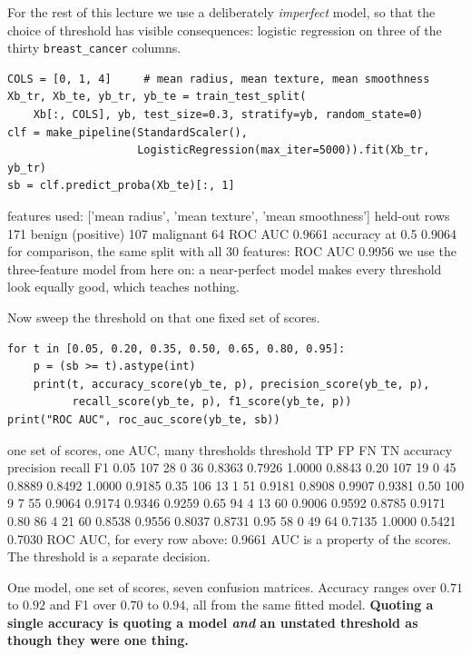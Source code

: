 \documentclass[11pt]{article}
\begin{document}
For the rest of this lecture we use a deliberately \emph{imperfect} model, so
that the choice of threshold has visible consequences: logistic regression on
three of the thirty \texttt{breast\_cancer} columns.

\begin{lstlisting}
COLS = [0, 1, 4]     # mean radius, mean texture, mean smoothness
Xb_tr, Xb_te, yb_tr, yb_te = train_test_split(
    Xb[:, COLS], yb, test_size=0.3, stratify=yb, random_state=0)
clf = make_pipeline(StandardScaler(),
                    LogisticRegression(max_iter=5000)).fit(Xb_tr, yb_tr)
sb = clf.predict_proba(Xb_te)[:, 1]
\end{lstlisting}
\begin{codeout}
features used: ['mean radius', 'mean texture', 'mean smoothness']
held-out rows 171   benign (positive) 107   malignant 64
ROC AUC 0.9661   accuracy at 0.5 0.9064
for comparison, the same split with all 30 features: ROC AUC 0.9956
we use the three-feature model from here on: a near-perfect model
makes every threshold look equally good, which teaches nothing.
\end{codeout}

Now sweep the threshold on that one fixed set of scores.

\begin{lstlisting}
for t in [0.05, 0.20, 0.35, 0.50, 0.65, 0.80, 0.95]:
    p = (sb >= t).astype(int)
    print(t, accuracy_score(yb_te, p), precision_score(yb_te, p),
          recall_score(yb_te, p), f1_score(yb_te, p))
print("ROC AUC", roc_auc_score(yb_te, sb))
\end{lstlisting}
\begin{codeout}
one set of scores, one AUC, many thresholds
threshold  TP  FP  FN  TN  accuracy  precision  recall     F1
   0.05    107  28   0  36    0.8363     0.7926  1.0000  0.8843
   0.20    107  19   0  45    0.8889     0.8492  1.0000  0.9185
   0.35    106  13   1  51    0.9181     0.8908  0.9907  0.9381
   0.50    100   9   7  55    0.9064     0.9174  0.9346  0.9259
   0.65     94   4  13  60    0.9006     0.9592  0.8785  0.9171
   0.80     86   4  21  60    0.8538     0.9556  0.8037  0.8731
   0.95     58   0  49  64    0.7135     1.0000  0.5421  0.7030
ROC AUC, for every row above:  0.9661
AUC is a property of the scores. The threshold is a separate decision.
\end{codeout}

\begin{keyidea}
One model, one set of scores, seven confusion matrices. Accuracy ranges over
$0.71$ to $0.92$ and F1 over $0.70$ to $0.94$, all from the same fitted model.
\textbf{Quoting a single accuracy is quoting a model \emph{and} an unstated
threshold as though they were one thing.}
\end{keyidea}
\end{document}
